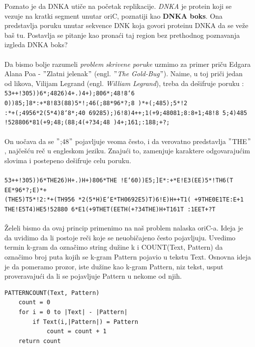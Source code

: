 Poznato je da DNKA utiče na početak replikacije. \textit{DNKA} je protein koji se vezuje na kratki segment unutar oriC, poznatiji kao \textbf{DNKA boks}. Ona predstavlja poruku unutar sekvence DNK koja govori proteinu DNKA da se veže baš tu. Postavlja se pitanje kao pronaći taj region bez prethodnog poznavanja izgleda DNKA boks? \\\\

Da bismo bolje razumeli \textit{problem skrivene poruke} uzmimo za primer priču Edgara Alana Poa - $"$Zlatni jelenak$"$ (engl. \textit{$"$The Gold-Bug$"$}).
Naime, u toj priči jedan od likova, Vilijam Legrand (engl. \textit{William Legrand}), treba da dešifruje poruku :\\

\texttt{53++!305))6*;4826)4+.)4+);806*;48!8`6
0))85;]8*:+*8!83(88)5*!;46(;88*96*?;8
)*+(;485);5*!2\\:*+(;4956*2(5*4)8`8*;40
69285);)6!8)4++;1(+9;48081;8:8+1;48!8
5;4)485\\!528806*81(+9;48;(88;4(+?34;48
)4+;161;:188;+?;}\\\\
On uočava da se $"$;48$"$ pojavljuje veoma često, i da verovatno predstavlja $"$THE$"$, najčešću reč u engleskom jeziku. Znajući to, zamenjuje karaktere odgovarajućim slovima i postepeno dešifruje celu poruku.\\\\
\texttt{53++!305))6*THE26)H+.)H+)806*THE
!E`60))E5;]E*:+*E!E3(EE)5*!TH6(T
EE*96*?;E)*+\\(THE5)T5*!2:*+(TH956
*2(5*H)E`E*TH0692E5)T)6!E)H++T1(
+9THE0E1TE:E+1\\THE!E5T4)HE5!52880
6*E1(+9THET(EETH(+?34THE)H+T161T
:1EET+?T}\\\\
Želeli bismo da ovaj princip primenimo na naš problem nalaska oriC-a. Ideja je da uvidimo da li postoje reči koje se neuobičajeno često pojavljuju. Uvedimo termin k-gram da označimo string dužine k i COUNT(Text, Pattern) da označimo broj puta kojih se k-gram Pattern pojavio u tekstu Text. Osnovna ideja je da pomeramo prozor, iste dužine kao k-gram Pattern, niz tekst, usput proveravajući da li se pojavljuje Pattern u nekome od njih. 

\begin{lstlisting}
PATTERNCOUNT(Text, Pattern)
	count = 0
	for i = 0 to |Text| - |Pattern|
		if Text(i,|Pattern|) = Pattern
			count = count + 1 
	return count
\end{lstlisting}
	
